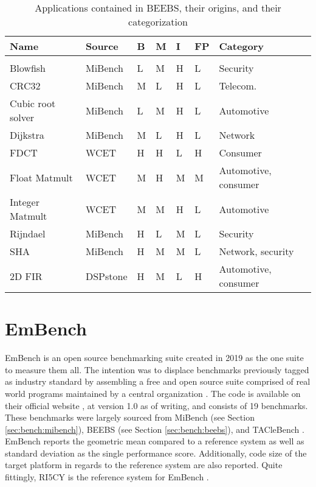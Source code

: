 \documentclass[../bachelor_paper.tex]{subfiles}
\begin{document}
\begin{table}
    \centering
    \begin{tabular}{lllllll}
    \textbf{Name}   & \textbf{Source}   & \textbf{B} & \textbf{M} & \textbf{I} & \textbf{FP}    & \textbf{Category} \\
    \hline\\[-0.9em]
    Blowfish        & MiBench   & L & M & H & L & Security \\
    CRC32           & MiBench   & M & L & H & L & Telecom. \\
    Cubic root solver & MiBench & L & M & H & L & Automotive \\
    Dijkstra        & MiBench   & M & L & H & L & Network  \\
    FDCT            & WCET      & H & H & L & H & Consumer \\
    Float Matmult   & WCET      & M & H & M & M & Automotive, consumer \\
    Integer Matmult & WCET      & M & M & H & L & Automotive \\
    Rijndael        & MiBench   & H & L & M & L & Security \\
    SHA             & MiBench   & H & M & M & L & Network, security \\
    2D FIR          & DSPstone  & H & M & L & H & Automotive, consumer \\
    \hline
    \end{tabular}
    \caption{Applications contained in BEEBS, their origins, and their categorization \cite{pallisterBEEBSOpenBenchmarks2013}}
    \label{tab:bench/beebs/apps}
\end{table}

\section{EmBench}
EmBench is an open source benchmarking suite created in 2019 as the one suite to measure them all. The intention was to displace benchmarks previously tagged as industry standard by assembling a free and open source suite comprised of real world programs maintained by a central organization \cite{jun11EmbenchRecruitingLong2019}. The code is available on their official website \cite{EmbenchModernEmbedded}, at version 1.0 as of writing, and consists of 19 benchmarks. These benchmarks were largely sourced from MiBench \cite{guthausMiBenchFreeCommercially2001} (see Section \ref{sec:bench:mibench}), BEEBS \cite{pallisterBEEBSOpenBenchmarks2013} (see Section \ref{sec:bench:beebs}), and TACleBench \cite{falkTACLeBenchBenchmarkCollection2016}. EmBench reports the geometric mean compared to a reference system as well as standard deviation as the single performance score. Additionally, code size of the target platform in regards to the reference system are also reported. Quite fittingly, RI5CY is the reference system for EmBench \cite{jun11EmbenchRecruitingLong2019}.
\end{document}
